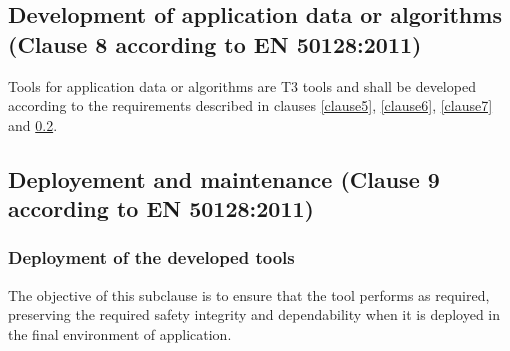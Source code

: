 \documentclass{template/openetcs_report}
\begin{document}
\subsection{Development of application data or algorithms (Clause 8 according to EN 50128:2011)}
Tools for application data or algorithms are T3 tools and shall be developed according to the requirements described in clauses \ref{clause5}, \ref{clause6}, \ref{clause7} and \ref{clause9}.
\linebreak
\linebreak


\subsection{Deployement and maintenance (Clause 9 according to EN 50128:2011)}
\label{clause9}
\subsubsection{Deployment of the developed tools}
\begin{flushleft}
The objective of this subclause is to ensure that the tool performs as required, preserving the required safety integrity and dependability when it is deployed in the final environment of application.
\end{flushleft}
\end{document}
